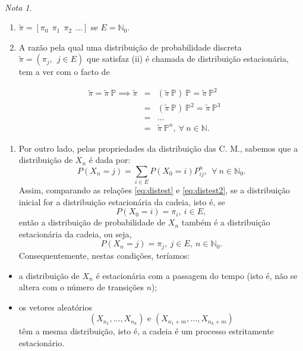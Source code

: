 \documentclass[
  11pt,
  a4paper,
]{book}
\providecommand{\tightlist}{%
  \setlength{\itemsep}{0pt}\setlength{\parskip}{0pt}}
\theoremstyle{definition}
\theoremstyle{definition}
\theoremstyle{definition}
\theoremstyle{definition}
\theoremstyle{remark}
\newtheorem*{remark}{Nota }
\begin{document}
\(\,\)

\begin{remark}
\leavevmode

\begin{enumerate}
\def\labelenumi{\arabic{enumi}.}
\item
  \(\tilde{\pi}=[\pi_0 ~~ \pi_1 ~~ \pi_2 ~~\dots]\) se \(E=\mathbb{N}_0\).
\item
  A razão pela qual uma distribuição de probabilidade discreta \(\tilde{\pi}=(\pi_j, ~ ~j \in E)\) que satisfaz (ii) é chamada de distribuição estacionária, tem a ver com o facto de
\end{enumerate}

\begin{eqnarray*}
\tilde{\pi}= \tilde{\pi}~ \mathbb{P} \implies 
\tilde{\pi} &=& (\tilde{\pi}~ \mathbb{P}) ~ \mathbb{P} = \tilde{\pi}~ \mathbb{P}^2 \\
            &=& (\tilde{\pi}~ \mathbb{P}) ~ \mathbb{P}^2 = \tilde{\pi}~ \mathbb{P}^3 \\
            &=& \dots \\
            &=& \tilde{\pi}~ \mathbb{P}^n, ~\forall ~n \in \mathbb{N}.
\end{eqnarray*}

\begin{enumerate}
\def\labelenumi{\arabic{enumi}.}
\setcounter{enumi}{2}
\tightlist
\item
  Por outro lado, pelas propriedades da distribuição das C. M., sabemos que a distribuição de \(X_n\) é dada por:
  \[
  P(X_n=j)= \sum\limits_{i \in E} P(X_0=i)P_{ij}^n, ~~\forall ~n \in \mathbb{N}_0. \label{eq:distest2}
  \]
  Assim, comparando as relações \eqref{eq:distest} e \eqref{eq:distest2}, se a distribuição inicial for a distribuição estacionária da cadeia, isto é, se
  \[P(X_0=i)=\pi_i, ~i\in E,\]
  então a distribuição de probabilidade de \(X_n\) também é a distribuição estacionária da cadeia, ou seja,
  \[P(X_n=j)=\pi_j, ~j\in E, ~n \in \mathbb{N}_0.\]
  Consequentemente, nestas condições, teríamos:
\end{enumerate}

\begin{itemize}
\item
  a distribuição de \(X_n\) é estacionária com a passagem do tempo (isto é, não se altera com o número de transições \(n\));
\item
  os vetores aleatórios
  \[(X_{n_1}, \dots, X_{n_k}) \text{ e } (X_{n_1+m}, \dots, X_{n_k+m})\]
  têm a mesma distribuição, isto é, a cadeia é um processo estritamente estacionário.
\end{itemize}

\end{remark}
\end{document}
